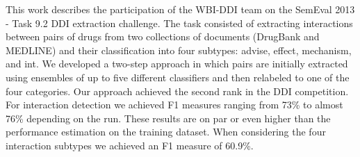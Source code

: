 This work describes the participation of the WBI-DDI team on the SemEval 2013 - Task 9.2 DDI extraction challenge.
 The task consisted of extracting interactions between pairs of drugs from two
 collections of documents (DrugBank and MEDLINE) and their classification 
 into four subtypes: advise, effect, mechanism, and int.
 We developed a two-step approach in which pairs are initially extracted using
 ensembles of up to five different classifiers and then relabeled to one of the
 four categories.
 Our approach achieved the second rank in the DDI competition.
 For interaction detection we achieved F1 measures ranging from 73\% to almost
 76\% depending on the run.
 These results are on par or even higher than the performance estimation on the
 training dataset.
 When considering the four interaction subtypes we achieved an F1 measure of
 60.9\%.

